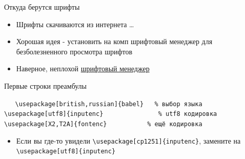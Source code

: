 \documentclass[aspectratio=169]{beamer} %
\begin{document}
{
\begin{frame}{Откуда берутся шрифты}
\Large
\begin{itemize}
\item Шрифты скачиваются из интернета \ldots
\item Хорошая идея - установить на комп шрифтовый менеджер для безболезненного просмотра шрифтов
\item Наверное, неплохой \href{http://fontba.se/}{ шрифтовый менеджер}
\end{itemize}
\end{frame}
}


\begin{frame}[fragile]{Первые строки преамбулы}
\begin{block}{  }
\verb|   \usepackage[british,russian]{babel}   % выбор языка| \newline
\verb|   \usepackage[utf8]{inputenc}               % utf8 кодировка| \newline
\verb|   \usepackage[X2,T2A]{fontenc}           % ещё кодировка|
\end{block}

\begin{itemize}
\item Если вы где-то увидели \verb|\usepackage[cp1251]{inputenc}|,  замените  на  \verb|\usepackage[utf8]{inputenc}|
\end{itemize}
\end{frame}
\end{document}
